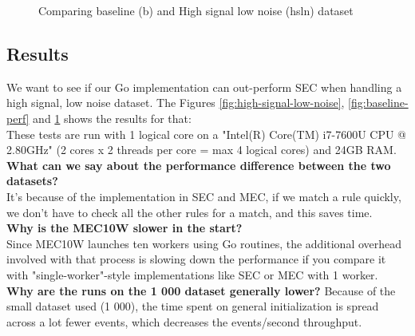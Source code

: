 \begin{figure}[ht]
\centering
{}
\caption{Comparing baseline (b) and High signal low noise (hsln) dataset}
\label{fig:comparing-perf}
\end{figure}

\subsection{Results}
We want to see if our Go implementation can out-perform SEC when handling a high signal, low noise dataset. The Figures \ref{fig:high-signal-low-noise}, \ref{fig:baseline-perf} and \ref{fig:comparing-perf} shows the results for that:
\\
These tests are run with 1 logical core on a "Intel(R) Core(TM) i7-7600U CPU @ 2.80GHz" (2 cores x 2 threads per core = max 4 logical cores) and 24GB RAM.\\
\textbf{What can we say about the performance difference between the two datasets?}\\
It's because of the implementation in SEC and MEC, if we match a rule quickly, we don't have to check all the other rules for a match, and this saves time.\\
\textbf{Why is the MEC10W slower in the start?}\\
Since MEC10W launches ten workers using Go routines, the additional overhead involved with that process is slowing down the performance if you compare it with "single-worker"-style implementations like SEC or MEC with 1 worker.\\
\textbf{Why are the runs on the 1 000 dataset generally lower?}
Because of the small dataset used (1 000), the time spent on general initialization is spread across a lot fewer events, which decreases the events/second throughput.

